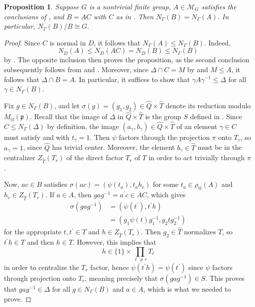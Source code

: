 \documentclass[11pt]{article}
\theoremstyle{plain}
\newtheorem{prop}[thm]{Proposition}
\theoremstyle{definition}
\theoremstyle{remark}
\newcommand{\calM}{\mathcal{M}}
\newcommand{\frakp}{\mathfrak{p}}
\newcommand{\gam}{\gamma}
\newcommand{\Gam}{\Gamma}
\newcommand{\Del}{\Delta}
\newcommand{\sig}{\sigma}
\newcommand{\wh}{\widehat}
\newenvironment{pf}{\begin{proof}}{\end{proof}}
\begin{document}
\begin{prop}\label{prop:FinalNontrivialG}
Suppose $G$ is a nontrivial finite group, $A \in \calM_G$ satisfies the conclusions of , and $B = AC$ with $C$ as in . Then $N_\Gam(B) = N_\Gam(A)$. In particular, $N_\Gam(B) / B \cong G$.
\end{prop}
\begin{pf}
Since $C$ is normal in $D$, it follows that $N_\Gam(A) \le N_\Gam(B)$. Indeed,
\begin{equation}\label{eq:NDA}
N_D(A) \le N_D(AC) = N_D(B) \le N_\Gam(B)
\end{equation}
by . The opposite inclusion then proves the proposition, as the second conclusion subsequently follows from  and . Moreover, since $\Del \cap C = M$ by  and $M \le A$, it follows that $\Del \cap B = A$. In particular, it suffices to show that $\gam A \gam^{-1} \le \Del$ for all $\gam \in N_\Gam(B)$.

Fix $g \in N_\Gam(B)$, and let $\sig(g) = (g_1, g_2) \in \wh{Q} \times \wh{T}$ denote its reduction modulo $M_\mathrm{tf}(\frakp)$. Recall that the image of $\Del$ in $\wh{Q} \times \wh{T}$ is the group $S$ defined in . Since $C \le N_\Gam(\Del)$ by definition, the image $(a_\gam,b_\gam) \in \wh{Q} \times \wh{T}$ of an element $\gam \in C$ must satisfy  and  with $t_\gam = 1$. Then $\psi$ factors through the projection $\pi$ onto $T_r$, so $a_\gam = 1$, since $\wh{Q}$ has trivial center. Moreover, the element $b_\gam \in \wh{T}$ must be in the centralizer $Z_{\wh{T}}(T_r)$ of the direct factor $T_r$ of $T$ in order to act trivially through $\pi$.

Now, $ac \in B$ satisfies $\sig(ac) = (\psi(t_a), t_a h_c)$ for some $t_a \in \rho_{\mathrm{tf}}(A)$ and $h_c \in Z_{\wh{T}}(T_r)$. If $a \in A$, then $g a g^{-1} = a^\prime c \in AC$, which gives
\begin{align}
\sig\!\left(g a g^{-1}\right) &= \left(\psi(t^\prime), t^\prime h\right) \nonumber \\
&= \left(g_1 \psi(t) g_1^{-1}, g_2 t g_2^{-1}\right) \label{eq:ACendgame}
\end{align}
for the appropriate $t, t^\prime \in T$ and $h \in Z_{\wh{T}}(T_r)$. Then $g_2 \in \wh{T}$ normalizes $T$, so $t^\prime h \in T$ and then $h \in T$. However, this implies that
\begin{equation}\label{eq:hCentralizes}
h \in \{1\} \times \prod_{\ell \neq r} T_\ell
\end{equation}
in order to centralize the $T_r$ factor, hence $\psi(t^\prime h) = \psi(t^\prime)$ since $\psi$ factors through projection onto $T_r$, meaning precisely that $\sig(g a g^{-1}) \in S$. This proves that $g a g^{-1} \in \Del$ for all $g \in N_\Gam(B)$ and $a \in A$, which is what we needed to prove.
\end{pf}
\end{document}
